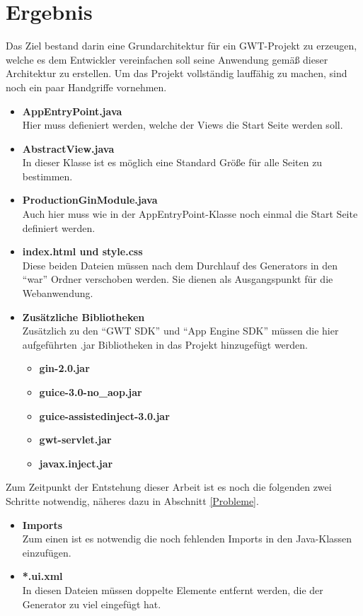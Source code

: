 \chapter{Ergebnis} \label{Ergebnis}

Das Ziel bestand darin eine Grundarchitektur für ein GWT-Projekt zu erzeugen,
welche es dem Entwickler vereinfachen soll seine Anwendung gemäß dieser
Architektur zu erstellen.
Um das Projekt vollständig lauffähig zu machen, sind noch ein paar Handgriffe
vornehmen.

\begin{itemize}
  \item \textbf{AppEntryPoint.java} \\
  Hier muss defieniert werden, welche der Views die Start Seite werden soll.
  \item \textbf{AbstractView.java} \\
  In dieser Klasse ist es möglich eine Standard Größe für alle Seiten zu
  bestimmen.
  \item \textbf{ProductionGinModule.java} \\
  Auch hier muss wie in der AppEntryPoint-Klasse noch einmal die Start Seite
  definiert werden.
  \item \textbf{index.html und style.css} \\
  Diese beiden Dateien müssen nach dem Durchlauf des Generators in den "`war"'
  Ordner verschoben werden. Sie dienen als Ausgangspunkt für die Webanwendung.
  \item \textbf{Zusätzliche Bibliotheken}\\
  	Zusätzlich zu den "`GWT SDK"' und "`App Engine SDK"' müssen die
    hier aufgeführten .jar Bibliotheken in das Projekt hinzugefügt werden.
  	\begin{itemize}
  	  \item \textbf{gin-2.0.jar}
  	  \item \textbf{guice-3.0-no\_aop.jar}
  	  \item \textbf{guice-assistedinject-3.0.jar}
  	  \item \textbf{gwt-servlet.jar}
  	  \item \textbf{javax.inject.jar}
	\end{itemize}
\end{itemize}
Zum Zeitpunkt der Entstehung dieser Arbeit ist es noch die folgenden
zwei Schritte notwendig, näheres dazu in Abschnitt \ref{Probleme}.
\begin{itemize}
  \item \textbf{Imports} \\
  Zum einen ist es notwendig die noch fehlenden Imports in den Java-Klassen
  einzufügen. 
  \item \textbf{*.ui.xml} \\
  In diesen Dateien müssen doppelte Elemente entfernt werden, die der Generator zu
  viel eingefügt hat.
\end{itemize} 

